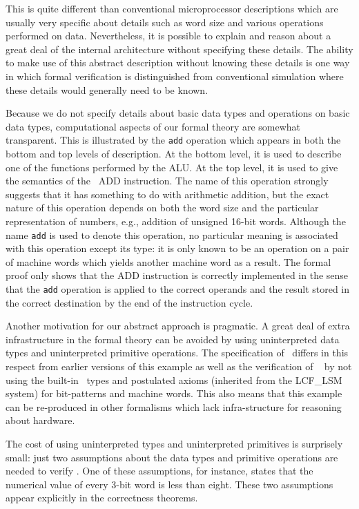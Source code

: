 This is quite different than conventional microprocessor descriptions
which are usually very specific about details such as word size
and various operations performed on data.
Nevertheless, it is possible to explain and
reason about a great deal of the
internal architecture without specifying these details.
The ability to make use of this abstract description without knowing
these details is one way in which formal verification is distinguished
from conventional simulation where these details would
generally need to be known.

Because we do not specify details about basic data types and
operations on basic data types,
computational aspects of
our formal theory are somewhat transparent.
This is illustrated by the \verb"add" operation which
appears in both the bottom and top levels of description.
At the bottom level, it is used to describe
one of the functions performed by the ALU.
At the top level, it is used to give
the semantics of the \Tamarack\ ADD instruction.
The name of this operation strongly suggests that it has
something to do with arithmetic addition,
but the exact nature of this operation depends on
both the word size and the particular representation of numbers,
e.g., addition of unsigned 16-bit words.
Although the name \verb"add" is used to denote this operation,
no particular meaning is associated with this operation except its type:
it is only known to be an operation on a pair of machine words which
yields another machine word as a result.
The formal proof only shows that the ADD instruction
is correctly implemented in the sense that the \verb"add" operation
is applied to the correct operands and the result
stored in the correct destination by the end of the instruction cycle.

Another motivation for our abstract approach is pragmatic.
A great deal of extra infrastructure in the formal theory
can be avoided by
using uninterpreted data types and
uninterpreted primitive operations.
The specification of \Tamarack\ differs in this respect
from earlier versions of this example
\cite{Gordon:tech42,Joyce:tech100,Joyce:calgary86}
as well as the verification of \Viper\ \cite{Cohn:calgary86,Cohn:banff87}
by not using the
built-in \HOL\ types
and postulated axioms (inherited from the {\small LCF\_LSM} system)
for bit-patterns and machine words.
This also means that this example can be re-produced
in other formalisms which lack infra-structure
for reasoning about hardware.

The cost of using uninterpreted types and uninterpreted primitives
is surprisely small: just two assumptions
about the data types and primitive operations
are needed to verify \Tamarack.
One of these assumptions,
for instance, states that the numerical value of
every 3-bit word is less than eight.
These two assumptions appear explicitly in
the correctness theorems.

